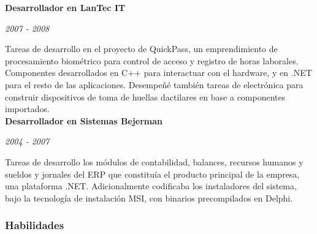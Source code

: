 \documentclass[a4paper,11pt]{article}
\begin{document}
\noindent \textbf{Desarrollador en LanTec IT}

\noindent \emph{2007 - 2008}

\noindent Tareas de desarrollo en el proyecto de QuickPass, un emprendimiento de procesamiento biométrico para control de acceso y registro de horas laborales. Componentes desarrollados en C++ para interactuar con el hardware, y en .NET para el resto de las aplicaciones. Desempeñé también tareas de electrónica para construir dispositivos de toma de huellas dactilares en base a componentes importados. \\

\noindent \textbf{Desarrollador en Sistemas Bejerman}

\noindent \emph{2004 - 2007}

\noindent Tareas de desarrollo los módulos de contabilidad, balances, recursos
humanos y sueldos y jornales del ERP que constituía el producto principal de la
empresa, una plataforma .NET. Adicionalmente codificaba los instaladores del
sistema, bajo la tecnología de instalación MSI, con binarios precompilados en
Delphi. \\

\subsubsection{Habilidades}
\end{document}

